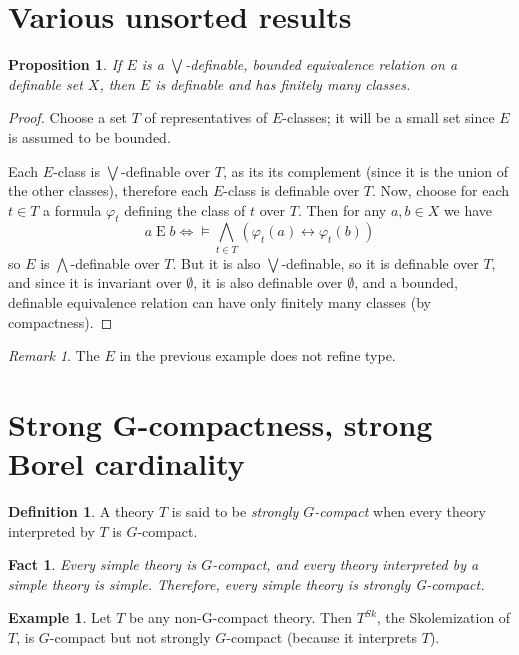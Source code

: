 \documentclass[final,a4paper,12pt]{amsart}
\newtheorem{prop}[thm]{Proposition}
\newtheorem{fct}[thm]{Fact}
\theoremstyle{remark}
\newtheorem{rem}[thm]{Remark}
\theoremstyle{definition}
\newtheorem{dfn}[thm]{Definition}
\newtheorem{ex}[thm]{Example}
\newcommand{\liff}{\mathrel{\leftrightarrow}}
\newcommand{\bigland}{\bigwedge}
\newcommand{\biglor}{\bigvee}
\begin{document}
	\section{Various unsorted results}
	\begin{prop}
		If $E$ is a $\biglor$-definable, bounded equivalence relation on a definable set $X$, then $E$ is definable and has finitely many classes.
	\end{prop}
	\begin{proof}
		Choose a set $T$ of representatives of $E$-classes; it will be a small set since $E$ is assumed to be bounded.
		
		Each $E$-class is $\biglor$-definable over $T$, as its its complement (since it is the union of the other classes), therefore each $E$-class is definable over $T$. Now, choose for each $t\in T$ a formula $\varphi_t$ defining the class of $t$ over $T$. Then for any $a,b\in X$ we have
		\[
		a\mathrel{E}b\iff \models \bigland_{t\in T} (\varphi_t(a)\liff \varphi_t(b))
		\]
		so $E$ is $\bigland$-definable over $T$. But it is also $\biglor$-definable, so it is definable over $T$, and since it is invariant over $\emptyset$, it is also definable over $\emptyset$, and a bounded, definable equivalence relation can have only finitely many classes (by compactness).
	\end{proof}
	
	
	
	\begin{rem}
		The $E$ in the previous example does not refine type.
	\end{rem}
	
	\section{Strong G-compactness, strong Borel cardinality}
	
	\begin{dfn}
		A theory $T$ is said to be \emph{strongly $G$-compact} when every theory interpreted by $T$ is $G$-compact.
	\end{dfn}
	
	\begin{fct}
		Every simple theory is $G$-compact, and every theory interpreted by a simple theory is simple. Therefore, every simple theory is strongly G-compact.
	\end{fct}
	
	
	\begin{ex}
		Let $T$ be any non-G-compact theory. Then $T^{Sk}$, the Skolemization of $T$, is $G$-compact but not strongly $G$-compact (because it interprets $T$).
	\end{ex}
	
\end{document}
